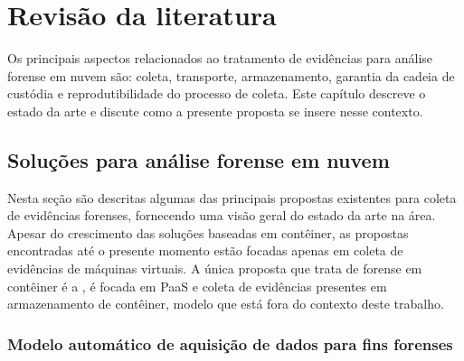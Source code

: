 \chapter{Revisão da literatura}
\label{chp:revisão}

Os principais aspectos relacionados ao tratamento de evidências para análise forense em nuvem são: coleta, transporte, armazenamento, garantia da cadeia de custódia e reprodutibilidade do processo de coleta. 
%
Este capítulo descreve o estado da arte e discute como a presente proposta se insere nesse contexto.


\section{Soluções para análise forense em nuvem}
\label{sec:estadodaarte}


Nesta seção são descritas algumas das principais propostas existentes para coleta de evidências forenses, fornecendo uma visão geral do estado da arte na área.
%
Apesar do crescimento das soluções baseadas em contêiner, as propostas encontradas até o presente momento estão focadas apenas em coleta de evidências de máquinas virtuais.
%
A única proposta que trata de forense em contêiner é a \cite{ContainerForensicsPaaS2016}, é focada em PaaS e coleta de evidências presentes em armazenamento de contêiner, modelo que está fora do contexto deste trabalho.

\subsection{Modelo automático de aquisição de dados para fins forenses}
\label{sec:aquisicaoautomatica}



